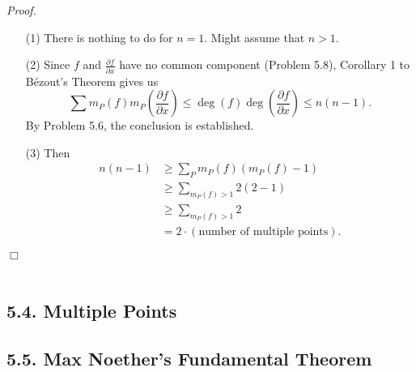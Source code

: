 \documentclass{article}
\begin{document}
\emph{Proof.}
\begin{enumerate}
\item[(1)]
  There is nothing to do for $n = 1$.
  Might assume that $n > 1$.

\item[(2)]
  Since $f$ and $\frac{\partial f}{\partial x}$ have no common component (Problem 5.8),
  Corollary 1 to B\'ezout's Theorem gives us
  \[
    \sum m_P(f) m_P\left( \frac{\partial f}{\partial x} \right)
    \leq \deg(f) \deg\left( \frac{\partial f}{\partial x} \right)
    \leq n(n-1).
  \]
  By Problem 5.6, the conclusion is established.

\item[(3)]
  Then
  \begin{align*}
    n(n-1)
    &\geq \sum_{P} m_P(f)(m_P(f)-1) \\
    &\geq \sum_{m_P(f) > 1} 2(2-1) \\
    &\geq \sum_{m_P(f) > 1} 2 \\
    &= 2 \cdot (\text{number of multiple points}).
  \end{align*}
\end{enumerate}
$\Box$ \\\\






\subsection*{5.4. Multiple Points \\}






\subsection*{5.5. Max Noether's Fundamental Theorem \\}
\end{document}
